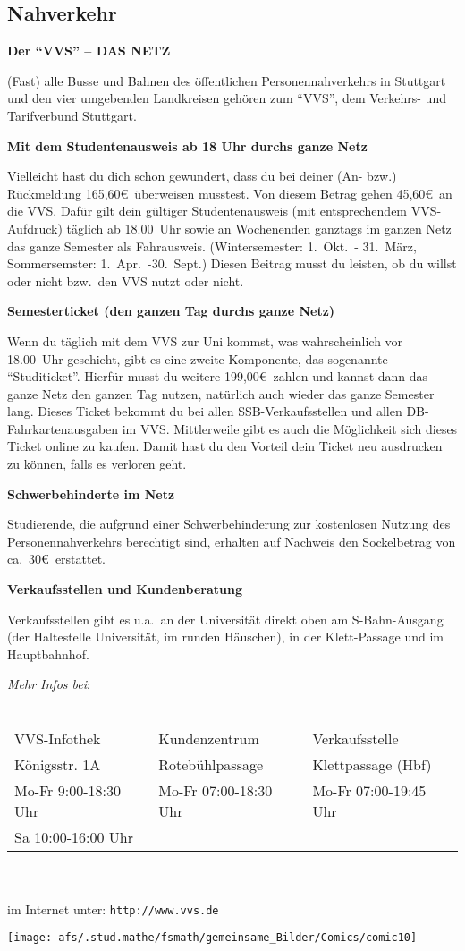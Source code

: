 \subsection{Nahverkehr}

{\large \bf Der "`VVS"' -- DAS NETZ}

(Fast) alle Busse und Bahnen des öffentlichen Personennahverkehrs
in Stuttgart und den vier umgebenden Landkreisen
gehören zum "`VVS"', dem Verkehrs- und Tarifverbund Stuttgart.

{\large \bf Mit dem Studentenausweis ab 18 Uhr durchs ganze Netz}

Vielleicht hast du dich schon gewundert,
dass du bei deiner (An- bzw.) Rückmeldung 165,60\euro\ überweisen musstest.
Von diesem Betrag gehen 45,60\euro\ an die VVS.
Dafür gilt dein gültiger Studentenausweis
(mit entsprechendem VVS-Aufdruck) täglich ab 18.00~Uhr
sowie an Wochenenden ganztags im ganzen Netz
das ganze Semester als Fahrausweis.
(Wintersemester: 1.~Okt.~- 31.~März, Sommersemster: 1.~Apr.~-30.~Sept.)
Diesen Beitrag musst du leisten,
ob du willst oder nicht bzw.~den VVS nutzt oder nicht.

{\large \bf Semesterticket (den ganzen Tag durchs ganze Netz)}

Wenn du täglich mit dem VVS zur Uni kommst,
was wahrscheinlich vor 18.00~Uhr geschieht,
gibt es eine zweite Komponente, das sogenannte "`Studiticket"'.
Hierfür musst du weitere 199,00\euro\ zahlen
und kannst dann das ganze Netz den ganzen Tag nutzen,
natürlich auch wieder das ganze Semester lang.
Dieses Ticket bekommt du bei allen SSB-Verkaufsstellen
und allen DB-Fahrkartenausgaben im VVS.
Mittlerweile gibt es auch die Möglichkeit sich dieses Ticket
online zu kaufen.
Damit hast du den Vorteil dein Ticket neu ausdrucken zu können,
falls es verloren geht.

{\large \bf Schwerbehinderte im Netz}

Studierende, die aufgrund einer Schwerbehinderung
zur kostenlosen Nutzung des Personennahverkehrs berechtigt sind,
erhalten auf Nachweis den Sockelbetrag von ca.\ 30\euro\ erstattet.

{\large \bf Verkaufsstellen und Kundenberatung}

Verkaufsstellen gibt es u.a.\ 
an der Universität direkt oben am S-Bahn-Ausgang
(der Haltestelle \glqq Universität\grqq, im runden Häuschen),
in der Klett-Passage und im Hauptbahnhof.

\newpage
{\it Mehr Infos bei}:\\
\\
\begin{tabular}{|l|l|l|}
\hline
VVS-Infothek & Kundenzentrum & Verkaufsstelle \\
Königsstr. 1A & Rotebühlpassage & Klettpassage (Hbf)  \\
Mo-Fr  9:00-18:30 Uhr & Mo-Fr 07:00-18:30 Uhr & Mo-Fr 07:00-19:45 Uhr \\
Sa 10:00-16:00 Uhr & & \\
\hline
\end{tabular}\\
\\
im Internet unter: \verb|http://www.vvs.de|


\vspace*{5cm}
\begin{center}
\texttt{[image: afs/.stud.mathe/fsmath/gemeinsame\_Bilder/Comics/comic10]}
\end{center}

